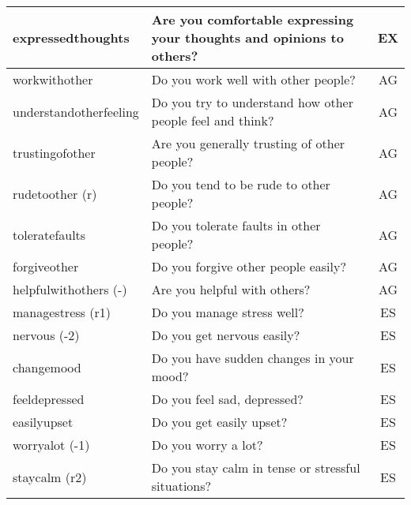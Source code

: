\begin{table}[htbp]
\begin{adjustbox}{max width=\textwidth}
\begin{tabular}{llc}
    expressedthoughts & Are you comfortable expressing your thoughts and opinions to others? & EX \\
	\midrule
    workwithother & Do you work well with other people? & AG   \\
    understandotherfeeling & Do you try to understand how other people feel and think? & AG  \\
    trustingofother & Are you generally trusting of other people? & AG  \\
    rudetoother (r) & Do you tend to be rude to other people? & AG   \\
    toleratefaults & Do you tolerate faults in other people? & AG   \\
    forgiveother & Do you forgive other people easily? & AG   \\
    helpfulwithothers (-) & Are you helpful with others? & AG  \\
	\midrule
    managestress (r1) & Do you manage stress well? & ES   \\
    nervous (-2) & Do you get nervous easily? & ES  \\
    changemood & Do you have sudden changes in your mood? & ES   \\
    feeldepressed & Do you feel sad, depressed? & ES   \\
    easilyupset & Do you get easily upset? & ES   \\
    worryalot (-1) & Do you worry a lot? & ES   \\
    staycalm (r2) & Do you stay calm in tense or stressful situations? & ES  \\
    \bottomrule
    \end{tabular}%
	\end{adjustbox}
\end{table}%
